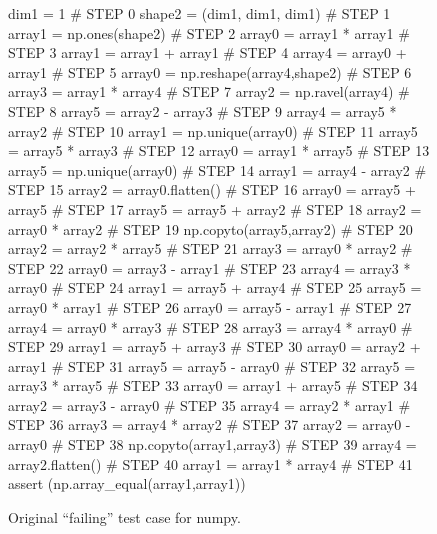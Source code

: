 \begin{figure}[t]
{\scriptsize
\begin{code}
 dim1 = 1                                       \# STEP 0
 shape2 = (dim1, dim1, dim1)                    \# STEP 1
 array1 = np.ones(shape2)                       \# STEP 2
 array0 = array1 * array1                       \# STEP 3
 array1 = array1 + array1                       \# STEP 4
 array4 = array0 + array1                       \# STEP 5
 array0 = np.reshape(array4,shape2)             \# STEP 6 
 array3 = array1 * array4                       \# STEP 7
 array2 = np.ravel(array4)                      \# STEP 8
 array5 = array2 - array3                       \# STEP 9 
 array4 = array5 * array2                       \# STEP 10
 array1 = np.unique(array0)                     \# STEP 11
 array5 = array5 * array3                       \# STEP 12
 array0 = array1 * array5                       \# STEP 13
 array5 = np.unique(array0)                     \# STEP 14
 array1 = array4 - array2                       \# STEP 15
 array2 = array0.flatten()                      \# STEP 16
 array0 = array5 + array5                       \# STEP 17
 array5 = array5 + array2                       \# STEP 18
 array2 = array0 * array2                       \# STEP 19
 np.copyto(array5,array2)                       \# STEP 20
 array2 = array2 * array5                       \# STEP 21
 array3 = array0 * array2                       \# STEP 22
 array0 = array3 - array1                       \# STEP 23
 array4 = array3 * array0                       \# STEP 24
 array1 = array5 + array4                       \# STEP 25
 array5 = array0 * array1                       \# STEP 26
 array0 = array5 - array1                       \# STEP 27
 array4 = array0 * array3                       \# STEP 28
 array3 = array4 * array0                       \# STEP 29
 array1 = array5 + array3                       \# STEP 30
 array0 = array2 + array1                       \# STEP 31
 array5 = array5 - array0                       \# STEP 32
 array5 = array3 * array5                       \# STEP 33
 array0 = array1 + array5                       \# STEP 34
 array2 = array3 - array0                       \# STEP 35
 array4 = array2 * array1                       \# STEP 36
 array3 = array4 * array2                       \# STEP 37
 array2 = array0 - array0                       \# STEP 38
 np.copyto(array1,array3)                       \# STEP 39
 array4 = array2.flatten()                      \# STEP 40
 array1 = array1 * array4                       \# STEP 41
 assert (np.array\_equal(array1,array1))
\end{code}
}
\caption{Original ``failing'' test case for numpy.}
\label{numpyorig}
\end{figure}

